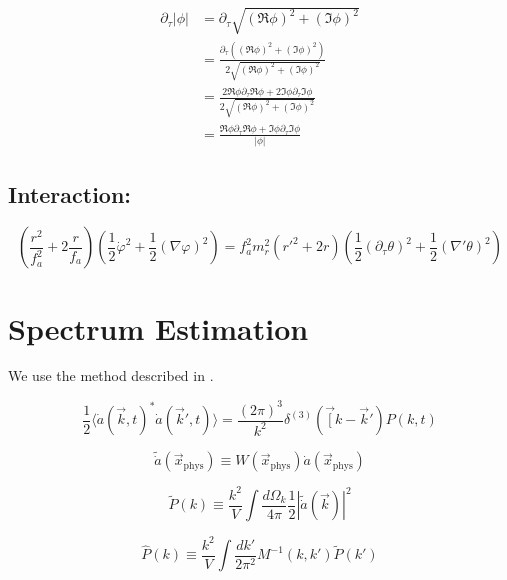 \documentclass[a4paper]{article}
\begin{document}
\begin{align}
    \partial_\tau |\phi| &= \partial_\tau \sqrt{ (\Re \phi)^2 + (\Im \phi)^2 } \\
                         &= \frac{ \partial_\tau ((\Re \phi)^2 + (\Im \phi)^2) }{ 2 \sqrt{ (\Re \phi)^2 + (\Im \phi)^2 } } \\
                         &= \frac{ 2 \Re \phi \partial_\tau \Re \phi + 2 \Im \phi \partial_\tau \Im \phi }{ 2 \sqrt{ (\Re \phi)^2 + (\Im \phi)^2 } } \\
                         &= \frac{ \Re \phi \partial_\tau \Re \phi + \Im \phi \partial_\tau \Im \phi }{ |\phi| }
\end{align}

\subsection{Interaction:}
\begin{equation}
\left( \frac{r^2}{f_a^2} + 2 \frac{r}{f_a} \right) \left( \frac{1}{2} \dot{\varphi}^2 + \frac{1}{2} (\nabla \varphi)^2 \right)
= f_a^2 m_r^2 (r'^2 + 2 r) \left( \frac{1}{2} (\partial_\tau \theta )^2 + \frac{1}{2} (\nabla' \theta)^2 \right)
\end{equation}

\section{Spectrum Estimation}

We use the method described in \cite[sec. 3.2]{improved_estimation_hiramatsu}.

\begin{equation}
    \frac{1}{2} \langle \dot{a}(\vec{k}, t)^* \dot{a}(\vec{k}', t) \rangle = \frac{(2\pi)^3}{k^2} \delta^{(3)}(\vec[{k} - \vec{k}') P(k, t)
\end{equation}

\begin{equation}
    \tilde{\dot{a}}(\vec{x}_\mathrm{phys}) \equiv W(\vec{x}_\mathrm{phys}) \dot{a}(\vec{x}_\mathrm{phys})
\end{equation}

\begin{equation}
    \tilde{P}(k) \equiv \frac{k^2}{V} \int \frac{d \Omega_k}{4\pi} \frac{1}{2} \left| \tilde{\dot{a}}( \vec{k} ) \right|^2
\end{equation}

\begin{equation}
    \hat{P}(k) \equiv \frac{k^2}{V} \int \frac{d k'}{2 \pi^2} M^{-1}(k, k') \tilde{P}(k')
\end{equation}
\end{document}
